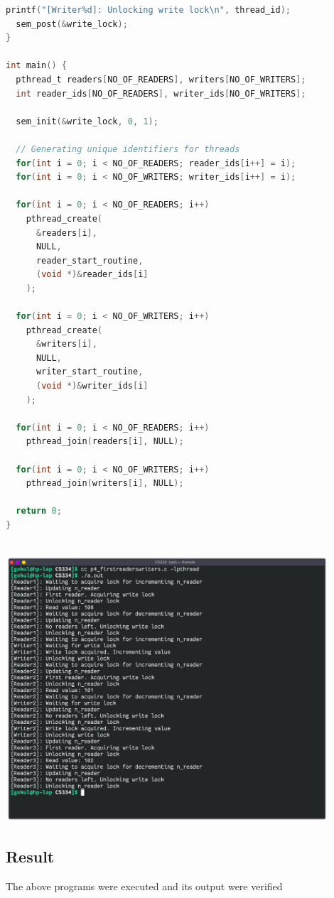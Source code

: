 \begin{lstlisting}[language=C]
  printf("[Writer%d]: Unlocking write lock\n", thread_id);
  sem_post(&write_lock);
}

int main() {
  pthread_t readers[NO_OF_READERS], writers[NO_OF_WRITERS];
  int reader_ids[NO_OF_READERS], writer_ids[NO_OF_WRITERS];
  
  sem_init(&write_lock, 0, 1);

  // Generating unique identifiers for threads
  for(int i = 0; i < NO_OF_READERS; reader_ids[i++] = i); 
  for(int i = 0; i < NO_OF_WRITERS; writer_ids[i++] = i); 
  
  for(int i = 0; i < NO_OF_READERS; i++) 
    pthread_create(
      &readers[i], 
      NULL, 
      reader_start_routine, 
      (void *)&reader_ids[i]
    );
  
  for(int i = 0; i < NO_OF_WRITERS; i++)
    pthread_create(
      &writers[i], 
      NULL, 
      writer_start_routine, 
      (void *)&writer_ids[i]
    );

  for(int i = 0; i < NO_OF_READERS; i++) 
    pthread_join(readers[i], NULL);

  for(int i = 0; i < NO_OF_WRITERS; i++)
    pthread_join(writers[i], NULL);

  return 0;
}



\end{lstlisting}

\begin{center}
	\includegraphics[width=0.90\textwidth]{img/p5.png}
\end{center}


\subsection{Result}
The above programs were executed and its output were verified
